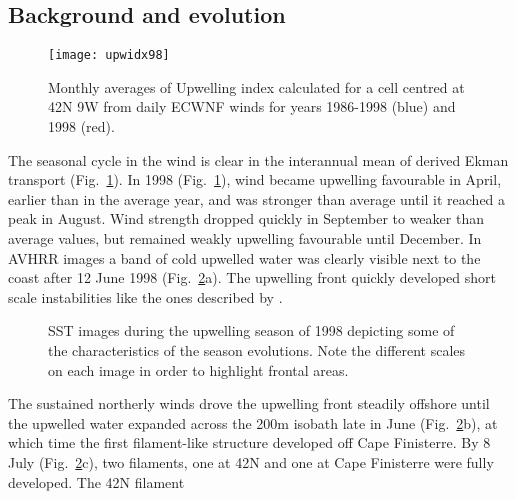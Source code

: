 \subsection{Background and evolution}
\begin{figure}
\centering %
\texttt{[image: upwidx98]}%
\caption{Monthly averages of Upwelling index calculated for a cell
centred at 42\deg N 9\deg W from daily ECWNF winds for years
1986-1998 (blue) and 1998 (red).}
\label{fig:cd114upidx}%
\end{figure}
The seasonal cycle in the wind is clear in the interannual mean of
derived Ekman transport (Fig.~\ref{fig:cd114upidx}). In 1998
(Fig.~\ref{fig:cd114upidx}), wind became upwelling favourable in
April, earlier than in the average year, and was stronger than
average until it reached a peak in August. Wind strength dropped
quickly in September to weaker than average values, but remained
weakly upwelling favourable until December. In AVHRR images a band
of cold upwelled water was clearly visible next to the coast after
12 June 1998 (Fig.~\ref{fig:cd114sst}a). The upwelling front
quickly developed short scale instabilities like the ones
described by \citet{Haynes93}.
\begin{figure}
\centering \abajocap%
%
%
\quad
{}%
%
\quad
{}%
%
\quad
\caption{SST images during the upwelling season of 1998 depicting
some of the characteristics of the season evolutions. Note the
different scales on each image in order to highlight frontal
areas. } \label{fig:cd114sst}
\end{figure}
The sustained northerly winds drove the upwelling front steadily
offshore until the upwelled water expanded across the 200m isobath
late in June (Fig.~\ref{fig:cd114sst}b), at which time the first
filament-like structure developed off Cape Finisterre. By 8 July
(Fig.~\ref{fig:cd114sst}c), two filaments, one at 42\deg N and one
at Cape Finisterre were fully developed. The 42\deg N filament
